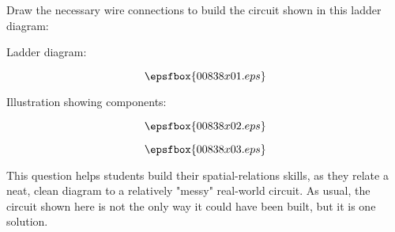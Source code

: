 

Draw the necessary wire connections to build the circuit shown in this ladder diagram:

\vskip 10pt

Ladder diagram:

$$\epsfbox{00838x01.eps}$$

\vskip 10pt

\goodbreak
Illustration showing components:

$$\epsfbox{00838x02.eps}$$







$$\epsfbox{00838x03.eps}$$







This question helps students build their spatial-relations skills, as they relate a neat, clean diagram to a relatively "messy" real-world circuit.  As usual, the circuit shown here is not the only way it could have been built, but it is one solution.




